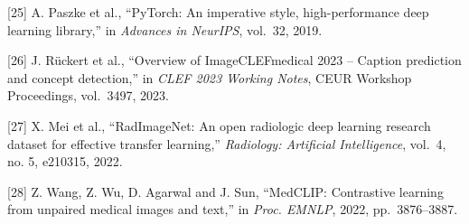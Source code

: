 {[}25{]} A. Paszke et al., ``PyTorch: An imperative style, high-performance deep learning library,'' in \emph{Advances in NeurIPS}, vol.~32, 2019.

{[}26{]} J. Rückert et al., ``Overview of ImageCLEFmedical 2023 -- Caption prediction and concept detection,'' in \emph{CLEF 2023 Working Notes}, CEUR Workshop Proceedings, vol.~3497, 2023.

{[}27{]} X. Mei et al., ``RadImageNet: An open radiologic deep learning research dataset for effective transfer learning,'' \emph{Radiology: Artificial Intelligence}, vol.~4, no. 5, e210315, 2022.

{[}28{]} Z. Wang, Z. Wu, D. Agarwal and J. Sun, ``MedCLIP: Contrastive learning from unpaired medical images and text,'' in \emph{Proc. EMNLP}, 2022, pp.~3876--3887.
